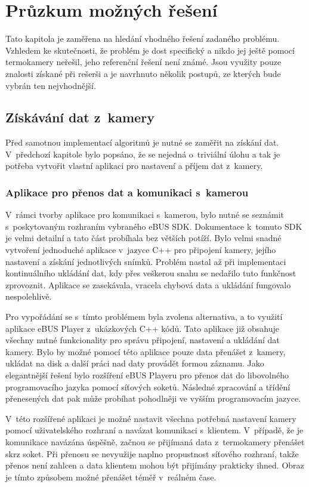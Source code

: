 \chapter{Průzkum možných řešení}
Tato kapitola je zaměřena na hledání vhodného řešení zadaného problému. Vzhledem ke skutečnosti, že problém je dost specifický a nikdo jej ještě pomocí termokamery neřešil, jeho referenční řešení není známé. Jsou využity pouze znalosti získané při rešerši a je navrhnuto několik postupů, ze kterých bude vybrán ten nejvhodnější.

\section{Získávání dat z~kamery}
Před samotnou implementací algoritmů je nutné se zaměřit na získání dat. V~předchozí kapitole bylo popsáno, že se nejedná o~triviální úlohu a tak je potřeba vytvořit vlastní aplikaci pro nastavení a příjem dat z~kamery.

	\subsection{Aplikace pro přenos dat a komunikaci s~kamerou}
    V~rámci tvorby aplikace pro komunikaci s~kamerou, bylo nutné se seznámit s~poskytovaným rozhraním vybraného eBUS SDK. Dokumentace k~tomuto SDK je velmi detailní a tato část probíhala bez větších potíží. Bylo velmi snadné vytvoření jednoduché aplikace v~jazyce C++ pro připojení kamery, jejího nastavení a získání jednotlivých snímků. Problém nastal až při implementaci kontinuálního ukládání dat, kdy přes veškerou snahu se nedařilo tuto funkčnost zprovoznit. Aplikace se zasekávala, vracela chybová data a ukládání fungovalo nespolehlivě.
    
    Pro vypořádání se s~tímto problémem byla zvolena alternativa, a to využití aplikace eBUS Player z~ukázkových C++ kódů. Tato aplikace již obsahuje všechny nutné funkcionality pro správu připojení, nastavení a ukládání dat kamery. Bylo by možné pomocí této aplikace pouze data přenášet z~kamery, ukládat na disk a další práci nad daty provádět formou záznamu. Jako elegantnější řešení bylo rozšíření eBUS Playeru pro přenos dat do libovolného programovacího jazyka pomocí síťových soketů. Následné zpracování a třídění přenesených dat pak může probíhat pohodlněji ve vyšším programovacím jazyce. 
    
    V~této rozšířené aplikaci je možné nastavit všechna potřebná nastavení kamery pomocí uživatelského rozhraní a navázat komunikaci s~klientem. V~případě, že je komunikace navázána úspěšně, začnou se přijímaná data z~termokamery přenášet skrz soket. Při přenosu se nevyužije naplno propustnost síťového rozhraní, takže přenos není zahlcen a data klientem mohou být přijímány prakticky ihned. Obraz je tímto způsobem možné přenášet téměř v~reálném čase.
    
